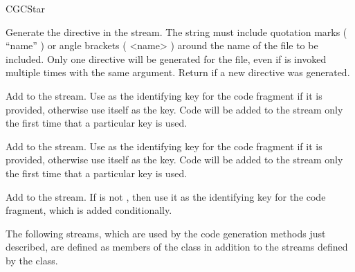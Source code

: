 \begin{indexlist}{CGCStar}

Generate the directive  in the
 stream.  The string
 must include quotation marks ( ``name'' ) or angle brackets
( <name> ) around the name of the file to be included.  Only one
 directive will be generated for the file,
even if  is invoked multiple times with the same
argument.  Return  if a new directive was generated.

Add  to the  stream.  Use  as the identifying key for the code
fragment if it is provided, otherwise use  itself as the
key.  Code will be added to the stream only the first time that a
particular key is used.

Add  to the  stream.  Use  as the identifying key for the code
fragment if it is provided, otherwise use  itself as the
key.  Code will be added to the stream only the first time that a
particular key is used.

\begin{ifhtml}

Add  to the 
stream.  If  is not , then use it as the
identifying key for the code fragment, which is added conditionally.

\end{ifhtml}

\end{indexlist}

The following streams, which are used by the code generation methods
just described, are defined as members of the
 class in addition to the
streams defined by the  class.

